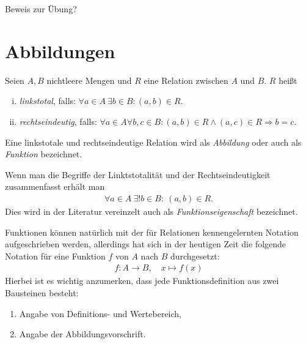 Beweis zur Übung? 

\section{Abbildungen}

\begin{mydef}
    Seien $A,B$  nichtleere Mengen und $R$ eine Relation zwischen $A$ und $B$. $R$ heißt 
    \begin{enumerate}[(i)]
        \item 
        \textit{linkstotal}, falls: $\forall a \in A \ \exists b \in B : (a,b) \in R$. 
        \item
        \textit{rechtseindeutig}, falls: $\forall a \in A \forall b,c \in B: (a,b) \in R \wedge (a,c) \in R \Rightarrow b = c $. 
    \end{enumerate}
    Eine linkstotale und rechtseindeutige Relation wird als \textit{Abbildung} oder auch als \textit{Funktion} bezeichnet. 
\end{mydef}

\begin{remark}
    Wenn man die Begriffe der Linktstotalität und der Rechtseindeutigkeit zusammenfasst erhält man 
    \begin{align}
        \forall a \in A \  \exists ! b \in B : \ (a,b) \in R. 
    \end{align}
    Dies wird in der Literatur vereinzelt auch als \textit{Funktionseigenschaft} bezeichnet. 
\end{remark}

\begin{remark}
    Funktionen können natürlich mit der für Relationen kennengelernten Notation aufgeschrieben werden, allerdings hat sich in der heutigen Zeit die folgende Notation
    für eine Funktion $f$ von $A$ nach $B$ durchgesetzt: 
    \begin{align*}
        f : A \to B, \quad x \mapsto f(x)
    \end{align*}
    Hierbei ist es wichtig anzumerken, dass jede Funktionsdefinition aus zwei Bausteinen besteht: 
    \begin{enumerate}
        \item Angabe von Definitions- und Wertebereich,
        \item Angabe der Abbildungsvorschrift. 
    \end{enumerate}
\end{remark}

